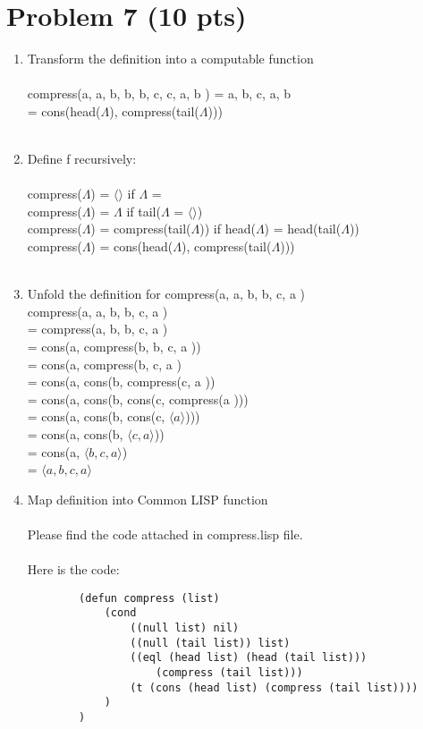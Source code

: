 \newpage

\section{Problem 7 (10 pts)}

\begin{enumerate}
    \item Transform the definition into a computable function\\ \\
    compress(\langle a, a, b, b, b, c, c, a, b \rangle) = \langle a, b, c, a, b \rangle \\
    = cons(head($\Lambda$), compress(tail($\Lambda$))) \\ \\
    \item Define f recursively: \\ \\
    compress($\Lambda$) = $\langle\rangle $  if $ \Lambda$ = \langle\rangle \\
    compress($\Lambda$) = $\Lambda $ if tail($\Lambda $ = $\langle\rangle$)\\
    compress($\Lambda$) = compress(tail($\Lambda $)) if head($\Lambda $) = head(tail($\Lambda$))\\
    compress($\Lambda$) = cons(head($\Lambda$), compress(tail($\Lambda$)))\\ \\
    \item Unfold the definition for compress(\langle a, a, b, b, c, a \rangle)\\
    compress(\langle a, a, b, b, c, a \rangle)\\
    = compress(\langle a, b, b, c, a \rangle)\\
    = cons(a, compress(\langle b, b, c, a \rangle))\\
    = cons(a, compress(\langle b, c, a \rangle)\\
    = cons(a, cons(b, compress(\langle c, a \rangle))\\
    = cons(a, cons(b, cons(c, compress(\langle a \rangle)))\\
    = cons(a, cons(b, cons(c, $\langle a \rangle$)))\\
    = cons(a, cons(b, $\langle c, a \rangle$))\\
    = cons(a, $\langle b, c, a \rangle$)\\
    = $\langle a, b, c, a \rangle$\\
    \item Map definition into Common LISP function\\ \\ 
    Please find the code attached in compress.lisp file. \\ \\
    Here is the code: 
    \begin{lstlisting}
        (defun compress (list)
            (cond
                ((null list) nil)
                ((null (tail list)) list)
                ((eql (head list) (head (tail list)))
                    (compress (tail list)))
                (t (cons (head list) (compress (tail list))))
            )
        )
    \end{lstlisting}
    
\end{enumerate}